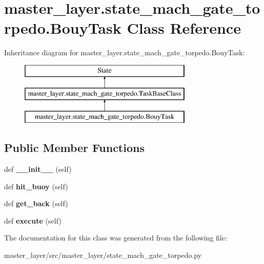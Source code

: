 \hypertarget{classmaster__layer_1_1state__mach__gate__torpedo_1_1BouyTask}{}\section{master\+\_\+layer.\+state\+\_\+mach\+\_\+gate\+\_\+torpedo.\+Bouy\+Task Class Reference}
\label{classmaster__layer_1_1state__mach__gate__torpedo_1_1BouyTask}
Inheritance diagram for master\+\_\+layer.\+state\+\_\+mach\+\_\+gate\+\_\+torpedo.\+Bouy\+Task\+:\begin{figure}[H]
\begin{center}
\leavevmode
\includegraphics[height=3.000000cm]{classmaster__layer_1_1state__mach__gate__torpedo_1_1BouyTask}
\end{center}
\end{figure}
\subsection*{Public Member Functions}
\begin{DoxyCompactItemize}
\item 
\mbox{\label{classmaster__layer_1_1state__mach__gate__torpedo_1_1BouyTask_aba070e4fb4114ba76e4fcf7487bd3f71}} 
def {\bfseries \+\_\+\+\_\+init\+\_\+\+\_\+} (self)
\item 
\mbox{\label{classmaster__layer_1_1state__mach__gate__torpedo_1_1BouyTask_aad1969a3203424015b3884640e75ff3a}} 
def {\bfseries hit\+\_\+buoy} (self)
\item 
\mbox{\label{classmaster__layer_1_1state__mach__gate__torpedo_1_1BouyTask_a2bdf8018611fc160803f144ade19b80c}} 
def {\bfseries get\+\_\+back} (self)
\item 
\mbox{\label{classmaster__layer_1_1state__mach__gate__torpedo_1_1BouyTask_a661817de7db221031d14d5c153ad8c6b}} 
def {\bfseries execute} (self)
\end{DoxyCompactItemize}


The documentation for this class was generated from the following file\+:\begin{DoxyCompactItemize}
\item 
master\+\_\+layer/src/master\+\_\+layer/state\+\_\+mach\+\_\+gate\+\_\+torpedo.\+py\end{DoxyCompactItemize}
